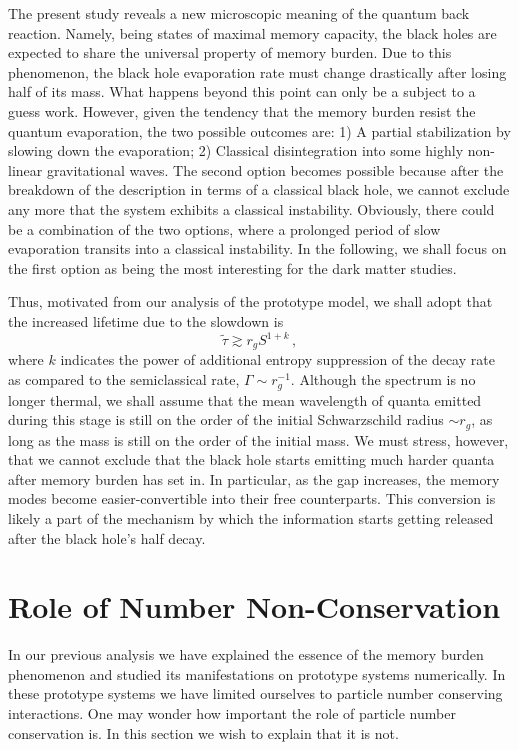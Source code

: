 \documentclass[aps,prd,reprint,superscriptaddress,nofootinbib]{revtex4-2}
\begin{document}
   
   The present study reveals a new microscopic meaning of the 
quantum back reaction. 
  Namely,  being states of maximal memory capacity, 
the black holes are expected to share the universal property  
of memory burden. Due to this phenomenon, the black hole evaporation rate 
must change drastically after 
losing half of its mass. What happens beyond this point 
can only be a subject to a guess work. 
However, given the tendency that  the memory burden 
resist the quantum evaporation, the two possible outcomes are: 1) 
A partial stabilization by slowing down the evaporation; 2) Classical disintegration into some highly non-linear gravitational waves.  
The second option becomes possible because after the breakdown of the description in terms of a classical black hole, we cannot exclude any more that the system exhibits a classical instability. Obviously, there could be a combination of the two options, where a prolonged period of slow evaporation transits into a classical instability. In the following, we shall 
focus on the first option as being the most interesting for 
the dark matter studies. 

Thus, motivated from our analysis of the prototype model, 
 we shall adopt that the increased lifetime due to the slowdown is
\begin{equation}\label{lifetimeSlowdown}
\tilde{\tau} \gtrsim r_g S^{1+k} \, ,
\end{equation}
where $k$ indicates the power of additional entropy suppression of the decay rate as compared to the semiclassical rate, $\Gamma \sim r_g^{-1}$. 
Although the spectrum is no longer thermal, we shall assume that the 
 mean wavelength of quanta emitted during this stage is still on the order of the initial Schwarzschild radius $\sim r_g$, as long as the mass is still on the order of the initial mass. We must stress, however, that we cannot exclude that the black hole starts emitting much harder quanta after memory burden has set in. In particular, as the gap increases, the memory modes become easier-convertible into their free counterparts. 
 	This conversion is likely a part of the mechanism by which the 
 	information starts getting released after the black hole's half decay. 
 	
 	
\section{Role of Number Non-Conservation }  
\label{sec:NNC}

In our previous analysis we have explained the essence of the 
memory burden phenomenon and studied its manifestations 
on prototype systems numerically. In these prototype systems 
we have limited ourselves to particle number conserving interactions. 
One may wonder how important the role of particle number 
conservation is. In this section we wish to explain that it is not. 
\end{document}
